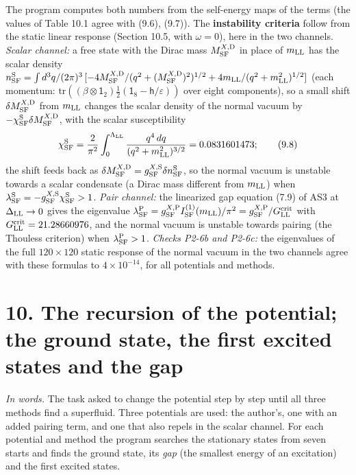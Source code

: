 \documentclass[
  10pt,
]{article}
\begin{document}
The program computes both numbers from the self-energy maps of the terms
(the values of Table 10.1 agree with (9.6), (9.7)). The
\textbf{instability criteria} follow from the static linear response
(Section 10.5, with \(\omega=0\)), here in the two channels.
\emph{Scalar channel:} a free state with the Dirac mass
\(M^{X,{\rm D}}_{\rm SF}\) in place of \(m_{\rm LL}\) has the scalar
density
\(n^{\rm S}_{\rm SF}=\int d^3q/(2\pi)^3\,[-4M^{X,{\rm D}}_{\rm SF}/(q^2+(M^{X,{\rm D}}_{\rm SF})^2)^{1/2}+4m_{\rm LL}/(q^2+m_{\rm LL}^2)^{1/2}]\)
(each momentum:
\(\mathrm{tr}((\beta\otimes\mathsf 1_2)\tfrac12(\mathsf 1_8-\mathsf h/\varepsilon))\)
over eight components), so a small shift
\(\delta M^{X,{\rm D}}_{\rm SF}\) from \(m_{\rm LL}\) changes the scalar
density of the normal vacuum by
\(-\chi^{\rm S}_{\rm SF}\delta M^{X,{\rm D}}_{\rm SF}\), with the scalar
susceptibility
\[\chi^{\rm S}_{\rm SF}=\frac2{\pi^2}\int_0^{\Lambda_{\rm LL}}\frac{q^4\,dq}{(q^2+m_{\rm LL}^2)^{3/2}}=0.0831601473;\tag{9.8}\]
the shift feeds back as
\(\delta M^{X,{\rm D}}_{\rm SF}=g^{X,{\rm S}}_{\rm SF}\delta n^{\rm S}_{\rm SF}\),
so the normal vacuum is unstable towards a scalar condensate (a Dirac
mass different from \(m_{\rm LL}\)) when
\(\lambda^{\rm S}_{\rm SF}=-g^{X,{\rm S}}_{\rm SF}\chi^{\rm S}_{\rm SF}>1\).
\emph{Pair channel:} the linearized gap equation (7.9) of AS3 at
\(\Delta_{\rm LL}\to0\) gives the eigenvalue
\(\lambda^{\rm P}_{\rm SF}=g^{X,{\rm P}}_{\rm SF}I^{(1)}_{\rm SF}(m_{\rm LL})/\pi^2=g^{X,{\rm P}}_{\rm SF}/G^{\rm crit}_{\rm LL}\)
with \(G^{\rm crit}_{\rm LL}=21.28660976\), and the normal vacuum is
unstable towards pairing (the Thouless criterion) when
\(\lambda^{\rm P}_{\rm SF}>1\). \emph{Checks P2-6b and P2-6c:} the
eigenvalues of the full \(120\times120\) static response of the normal
vacuum in the two channels agree with these formulas to
\(4\times10^{-14}\), for all potentials and methods.

\hypertarget{the-recursion-of-the-potential-the-ground-state-the-first-excited-states-and-the-gap}{%
\section{10. The recursion of the potential; the ground state, the first
excited states and the
gap}\label{the-recursion-of-the-potential-the-ground-state-the-first-excited-states-and-the-gap}}

\emph{In words.} The task asked to change the potential step by step
until all three methods find a superfluid. Three potentials are used:
the author's, one with an added pairing term, and one that also repels
in the scalar channel. For each potential and method the program
searches the stationary states from seven starts and finds the ground
state, its \emph{gap} (the smallest energy of an excitation) and the
first excited states.
\end{document}
